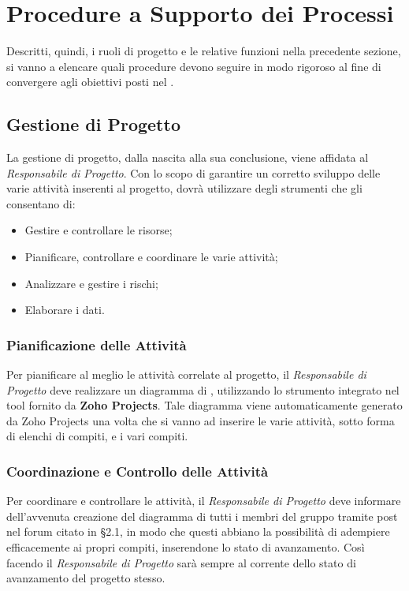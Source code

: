 \section{Procedure a Supporto dei Processi}

Descritti, quindi, i ruoli di progetto e le relative funzioni nella precedente sezione, si vanno a elencare quali procedure devono seguire in modo rigoroso al fine di convergere agli obiettivi posti nel \PianoDiQualifica.

\subsection{Gestione di Progetto}

La gestione di progetto, dalla nascita alla sua conclusione, viene affidata al \textit{Responsabile di Progetto}. Con lo scopo di garantire un corretto sviluppo delle varie attività inserenti al progetto, dovrà utilizzare degli strumenti che gli consentano di:

\begin{itemize}
\item Gestire e controllare le risorse;
\item Pianificare, controllare e coordinare le varie attività;
\item Analizzare e gestire i rischi;
\item Elaborare i dati.
\end{itemize}

\subsubsection{Pianificazione delle Attività}
Per pianificare al meglio le attività correlate al progetto, il \textit{Responsabile di Progetto} deve realizzare un diagramma di , utilizzando lo strumento integrato nel tool fornito da \textbf{Zoho Projects}. Tale diagramma viene automaticamente generato da Zoho Projects una volta che si vanno ad inserire le varie attività, sotto forma di elenchi di compiti, e i vari compiti.

\subsubsection{Coordinazione e Controllo delle Attività}
Per coordinare e controllare le attività, il \textit{Responsabile di Progetto} deve informare dell'avvenuta creazione del diagramma di  tutti i membri del gruppo tramite post nel forum citato in §2.1, in modo che questi abbiano la possibilità di adempiere efficacemente ai propri compiti, inserendone lo stato di avanzamento. Così facendo il \textit{Responsabile di Progetto} sarà sempre al corrente dello stato di avanzamento del progetto stesso.

